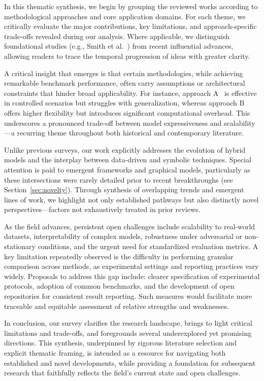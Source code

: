 \documentclass[sigconf]{acmart}
\begin{document}
In this thematic synthesis, we begin by grouping the reviewed works according to methodological approaches and core application domains. For each theme, we critically evaluate the major contributions, key limitations, and approach-specific trade-offs revealed during our analysis. Where applicable, we distinguish foundational studies (e.g., Smith et al.~\cite{smith2019}) from recent influential advances, allowing readers to trace the temporal progression of ideas with greater clarity.

A critical insight that emerges is that certain methodologies, while achieving remarkable benchmark performance, often carry assumptions or architectural constraints that hinder broad applicability. For instance, approach A~\cite{a2020} is effective in controlled scenarios but struggles with generalization, whereas approach B~\cite{b2021} offers higher flexibility but introduces significant computational overhead. This underscores a pronounced trade-off between model expressiveness and scalability—a recurring theme throughout both historical and contemporary literature.

Unlike previous surveys, our work explicitly addresses the evolution of hybrid models and the interplay between data-driven and symbolic techniques. Special attention is paid to emergent frameworks and graphical models, particularly as these intersections were rarely detailed prior to recent breakthroughs (see Section~\ref{sec:novelty}). Through synthesis of overlapping trends and emergent lines of work, we highlight not only established pathways but also distinctly novel perspectives—factors not exhaustively treated in prior reviews.

As the field advances, persistent open challenges include scalability to real-world datasets, interpretability of complex models, robustness under adversarial or non-stationary conditions, and the urgent need for standardized evaluation metrics. A key limitation repeatedly observed is the difficulty in performing granular comparison across methods, as experimental settings and reporting practices vary widely. Proposals to address this gap include: clearer specification of experimental protocols, adoption of common benchmarks, and the development of open repositories for consistent result reporting. Such measures would facilitate more traceable and equitable assessment of relative strengths and weaknesses.

In conclusion, our survey clarifies the research landscape, brings to light critical limitations and trade-offs, and foregrounds several underexplored yet promising directions. This synthesis, underpinned by rigorous literature selection and explicit thematic framing, is intended as a resource for navigating both established and novel developments, while providing a foundation for subsequent research that faithfully reflects the field's current state and open challenges.
\end{document}

